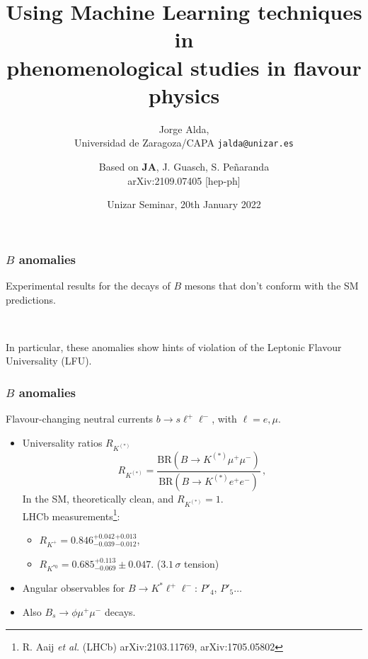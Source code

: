 \documentclass[mathserif, 10pt]{beamer}
\title[Using ML techniques in phenomenological studies in flavour physics]{Using Machine Learning techniques in\\ phenomenological studies in flavour physics}
\subtitle{Jorge Alda,\\ Universidad de Zaragoza/CAPA \hspace{4em} \texttt{jalda@unizar.es} }
\author[Jorge Alda]{Based on \textbf{JA}, J. Guasch, S. Peñaranda \\
arXiv:2109.07405 [hep-ph]}
\date[Unizar Seminar]{Unizar Seminar, 20th January 2022}
\begin{document}
\begin{frame}
\titlepage
\end{frame}

\begin{frame}
    \frametitle{$B$ anomalies}

    Experimental results for the decays of $B$ mesons that don't conform with the SM predictions.

    ~

    In particular, these anomalies show hints of violation of the Leptonic Flavour Universality (LFU).

\end{frame}

\begin{frame}
    \frametitle{$B$ anomalies}

    Flavour-changing neutral currents $b \to s \ell^+ \ell^-$, with $\ell = e, \mu$.
    \begin{itemize}
        \item Universality ratios $R_{K^{(*)}}$
              $$R_{K^{(*)}} = \frac{\mathrm{BR}(B\to K^{(*)}\mu^+ \mu^-)}{\mathrm{BR}(B\to K^{(*)}e^+ e^-)}\,, $$
              In the SM, theoretically clean, and $R_{K^{(*)}}=1$.\\
              LHCb measurements\footnote{R. Aaij \textit{et al.} (LHCb) arXiv:2103.11769, arXiv:1705.05802}:
              \begin{itemize}
                  \item $R_{K^+} = 0.846^{+0.042}_{-0.039}{}^{+0.013}_{-0.012}$,
                  \item $R_{K^{*0}} = 0.685^{+0.113}_{-0.069}\pm0.047$. ($3.1\,\sigma$ tension)
              \end{itemize}
        \item Angular observables for $B\to K^* \ell^+\ell^-$: $P'_4$, $P'_5\ldots$
        \item Also $B_s \to \phi \mu^+ \mu^-$ decays.
    \end{itemize}

\end{frame}
\end{document}
